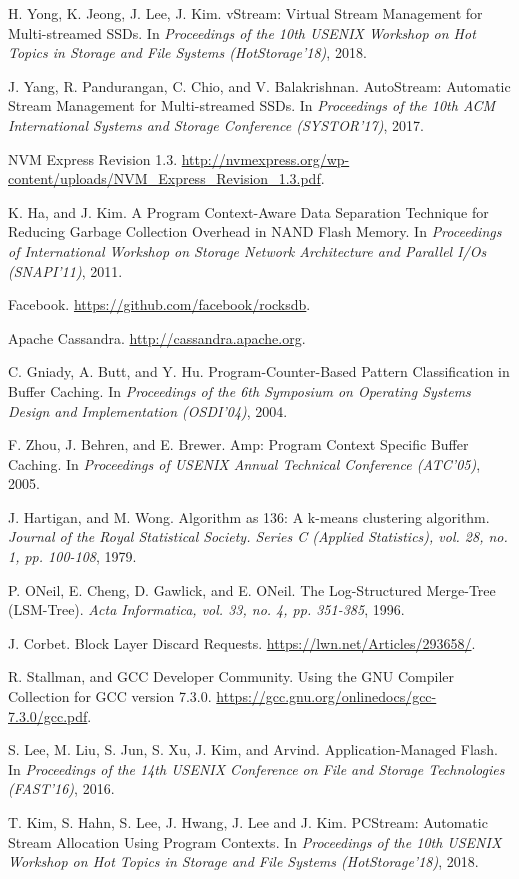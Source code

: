 \begin{thebibliography}{00}
H. Yong, K. Jeong, J. Lee, J. Kim.
vStream: Virtual Stream Management for Multi-streamed SSDs.
In \textit{Proceedings of the 10th USENIX Workshop on Hot Topics in Storage
and File Systems (HotStorage'18)}, 2018.

J. Yang, R. Pandurangan, C. Chio, and V. Balakrishnan.
AutoStream: Automatic Stream Management for Multi-streamed SSDs.
In \textit{Proceedings of the 10th ACM International Systems and Storage Conference (SYSTOR'17)}, 2017.


NVM Express Revision 1.3.
\url{http://nvmexpress.org/wp-content/uploads/NVM_Express_Revision_1.3.pdf}.

K. Ha, and J. Kim.
A Program Context-Aware Data Separation Technique for Reducing Garbage Collection Overhead in NAND Flash Memory.
In \textit{Proceedings of International Workshop on Storage Network Architecture 
and Parallel I/Os (SNAPI'11)}, 2011.

Facebook. 
\url{https://github.com/facebook/rocksdb}.

Apache Cassandra. 
\url{http://cassandra.apache.org}.

C. Gniady, A. Butt, and Y. Hu.
Program-Counter-Based Pattern Classification in Buffer Caching.
In \textit{Proceedings of the 6th Symposium on Operating Systems Design and Implementation (OSDI'04)}, 2004.

F. Zhou, J. Behren, and E. Brewer.
Amp: Program Context Specific Buffer Caching.
In \textit{Proceedings of USENIX Annual Technical Conference (ATC'05)}, 2005.

J. Hartigan, and M. Wong.
Algorithm as 136: A k-means clustering algorithm.
\textit{Journal of the Royal Statistical Society. Series C (Applied Statistics),
vol. 28, no. 1, pp. 100-108}, 1979.

P. ONeil, E. Cheng, D. Gawlick, and E. ONeil.
The Log-Structured Merge-Tree (LSM-Tree).
\textit{Acta Informatica, vol. 33, no. 4, pp. 351-385}, 1996.

J. Corbet.
Block Layer Discard Requests.
\url{https://lwn.net/Articles/293658/}.

R. Stallman, and GCC Developer Community.
Using the GNU Compiler Collection for GCC version 7.3.0.
\url{https://gcc.gnu.org/onlinedocs/gcc-7.3.0/gcc.pdf}.


S. Lee, M. Liu, S. Jun, S. Xu, J. Kim, and Arvind.
Application-Managed Flash.
In \textit{Proceedings of the 14th USENIX Conference on File and Storage
Technologies (FAST'16)}, 2016.

T. Kim, S. Hahn, S. Lee, J. Hwang, J. Lee and J. Kim.
PCStream: Automatic Stream Allocation Using Program Contexts.
In \textit{Proceedings of the 10th USENIX Workshop on Hot Topics in Storage
and File Systems (HotStorage'18)}, 2018.



\end{thebibliography}
